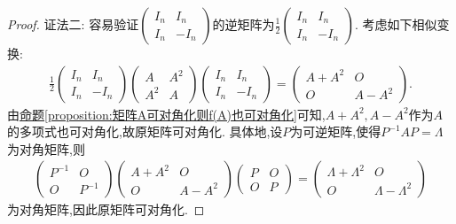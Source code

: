 \documentclass[../../main.tex]{subfiles}%
\begin{document}
\begin{proof}
{\color{blue}证法二:}
容易验证$\begin{pmatrix}I_n&I_n\\I_n&-I_n\end{pmatrix}$的逆矩阵为$\frac{1}{2}\begin{pmatrix}I_n&I_n\\I_n&-I_n\end{pmatrix}$. 考虑如下相似变换:
\begin{align*}
\frac{1}{2}\begin{pmatrix}I_n&I_n\\I_n&-I_n\end{pmatrix}\begin{pmatrix}A&A^2\\A^2&A\end{pmatrix}\begin{pmatrix}I_n&I_n\\I_n&-I_n\end{pmatrix}=\begin{pmatrix}A + A^2&O\\O&A - A^2\end{pmatrix}.
\end{align*}
由\hyperref[proposition:矩阵A可对角化则f(A)也可对角化]{命题\ref{proposition:矩阵A可对角化则f(A)也可对角化}}可知,$A + A^2,A - A^2$作为$A$的多项式也可对角化,故原矩阵可对角化. 具体地,设$P$为可逆矩阵,使得$P^{-1}AP=\Lambda$为对角矩阵,则
\begin{align*}
\begin{pmatrix}P^{-1}&O\\O&P^{-1}\end{pmatrix}\begin{pmatrix}A + A^2&O\\O&A - A^2\end{pmatrix}\begin{pmatrix}P&O\\O&P\end{pmatrix}=\begin{pmatrix}\Lambda+\Lambda^2&O\\O&\Lambda - \Lambda^2\end{pmatrix}
\end{align*}
为对角矩阵,因此原矩阵可对角化.

\end{proof}
\end{document}
